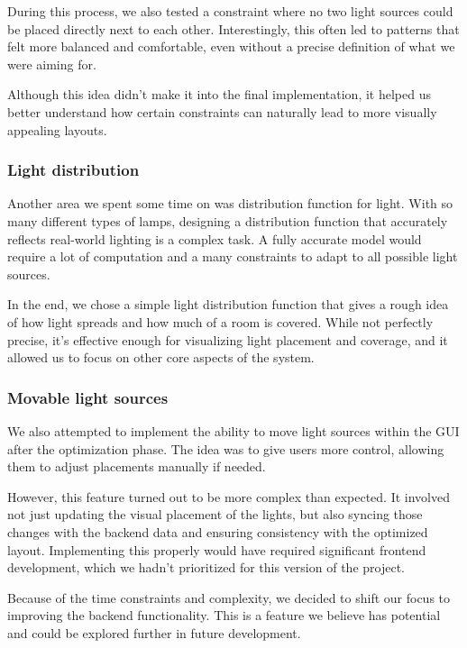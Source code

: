 \documentclass{article}
\begin{document}
During this process, we also tested a constraint where no two light sources could be placed directly next to each other. Interestingly, this often led to patterns that felt more balanced and comfortable, even without a precise definition of what we were aiming for.

Although this idea didn’t make it into the final implementation, it helped us better understand how certain constraints can naturally lead to more visually appealing layouts.

\subsubsection{Light distribution}
Another area we spent some time on was distribution function for light. With so many different types of lamps, designing a distribution function that accurately reflects real-world lighting is a complex task. A fully accurate model would require a lot of computation and a many constraints to adapt to all possible light sources.

In the end, we chose a simple light distribution function that gives a rough idea of how light spreads and how much of a room is covered. While not perfectly precise, it’s effective enough for visualizing light placement and coverage, and it allowed us to focus on other core aspects of the system.

\subsubsection{Movable light sources}
We also attempted to implement the ability to move light sources within the GUI after the optimization phase. The idea was to give users more control, allowing them to adjust placements manually if needed.

However, this feature turned out to be more complex than expected. It involved not just updating the visual placement of the lights, but also syncing those changes with the backend data and ensuring consistency with the optimized layout. Implementing this properly would have required significant frontend development, which we hadn’t prioritized for this version of the project.

Because of the time constraints and complexity, we decided to shift our focus to improving the backend functionality. This is a feature we believe has potential and could be explored further in future development.


\newpage
\end{document}
